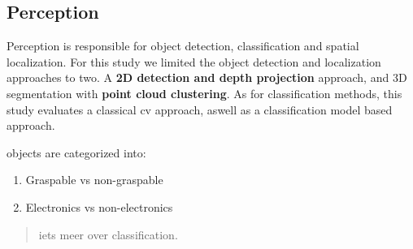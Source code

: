 \subsection{Perception}

Perception is responsible for object detection, classification and spatial localization. For this study we limited the object detection and localization approaches to two. A \textbf{2D detection and depth projection} approach, and 3D segmentation with \textbf{point cloud clustering}.
As for classification methods, this study evaluates a classical cv approach, aswell as a classification model based approach.

objects are categorized into:

\begin{enumerate}
\item Graspable vs non-graspable
\item Electronics vs non-electronics
\end{enumerate}

\begin{quote}
iets meer over classification.
\end{quote}